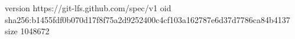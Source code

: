 version https://git-lfs.github.com/spec/v1
oid sha256:b1455fdf0b070d17f8f75a2d9252400c4cf103a162787e6d37d7786ca84b4137
size 1048672
